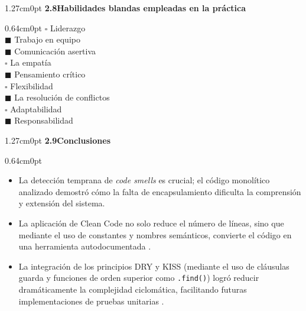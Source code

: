 \documentclass[12pt,letterpaper]{article}
\begin{document}
\vspace{6pt}

\begin{adjustwidth}{1.27cm}{0pt}
\textbf{2.8\enspace Habilidades blandas empleadas en la pr\'actica}
\end{adjustwidth}

\vspace{4pt}
\begin{adjustwidth}{0.64cm}{0pt}
$\square$ \; Liderazgo\\[2pt]
$\blacksquare$ \; Trabajo en equipo\\[2pt]
$\blacksquare$ \; Comunicaci\'on asertiva\\[2pt]
$\square$ \; La empat\'ia\\[2pt]
$\blacksquare$ \; Pensamiento cr\'itico\\[2pt]
$\square$ \; Flexibilidad\\[2pt]
$\blacksquare$ \; La resoluci\'on de conflictos\\[2pt]
$\square$ \; Adaptabilidad\\[2pt]
$\blacksquare$ \; Responsabilidad
\end{adjustwidth}

\vspace{6pt}

\begin{adjustwidth}{1.27cm}{0pt}
\textbf{2.9\enspace Conclusiones}
\end{adjustwidth}

\vspace{2pt}
\begin{adjustwidth}{0.64cm}{0pt}
\begin{itemize}[leftmargin=1.27cm, label=\textbullet, topsep=1pt, itemsep=0pt, parsep=0pt]
  \item La detecci\'on temprana de \textit{code smells} es crucial; el c\'odigo monol\'itico analizado demostr\'o c\'omo la falta de encapsulamiento dificulta la comprensi\'on y extensi\'on del sistema.
  \item La aplicaci\'on de Clean Code no solo reduce el n\'umero de l\'ineas, sino que mediante el uso de constantes y nombres sem\'anticos, convierte el c\'odigo en una herramienta autodocumentada \cite{martin2009clean}.
  \item La integraci\'on de los principios DRY y KISS (mediante el uso de cl\'ausulas guarda y funciones de orden superior como \texttt{.find()}) logr\'o reducir dram\'aticamente la complejidad ciclom\'atica, facilitando futuras implementaciones de pruebas unitarias \cite{gamma1994design}.
\end{itemize}
\end{adjustwidth}
\end{document}

